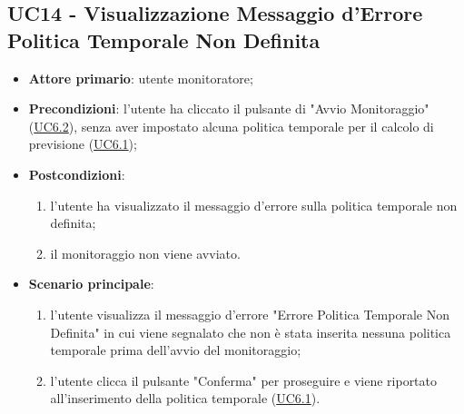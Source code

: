 
		\label{par:UC14}
	\subsection{UC14 - Visualizzazione Messaggio d'Errore Politica Temporale Non Definita}
		\begin{itemize}
			\item\textbf{Attore primario}: utente monitoratore;
			\item\textbf{Precondizioni}: l’utente ha cliccato il pulsante di "Avvio Monitoraggio" (\hyperref[par:UC6.2]{UC6.2}), senza aver impostato alcuna politica temporale per il calcolo di previsione  (\hyperref[par:UC6.1]{UC6.1});
			\item\textbf{Postcondizioni}:
				\begin{enumerate} 
					\item l’utente ha visualizzato il messaggio d'errore sulla politica temporale non definita;		
					\item	il monitoraggio non viene avviato.
				\end{enumerate}
			\item\textbf{Scenario principale}: 
				\begin{enumerate} 
					\item l’utente visualizza il messaggio d'errore "Errore Politica Temporale Non Definita" in cui viene segnalato che non è stata inserita nessuna politica temporale prima dell'avvio del monitoraggio; 
					\item l'utente clicca il pulsante "Conferma" per proseguire e viene riportato all'inserimento della politica temporale (\hyperref[par:UC6.1]{UC6.1}).		
				\end{enumerate}		
		\end{itemize}

	
		\label{par:UC15}
